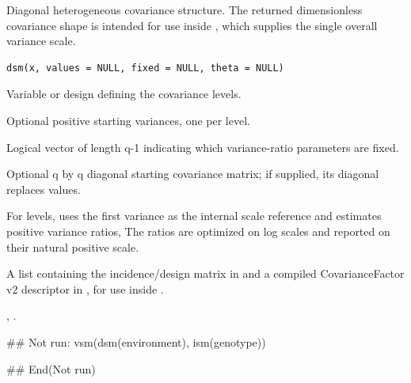 \documentclass[a4paper]{book}
\begin{document}
%
\begin{Description}\relax
Diagonal heterogeneous covariance structure. The returned dimensionless covariance shape is intended for use inside , which supplies the single overall variance scale.
\end{Description}
%
\begin{Usage}
\begin{verbatim}
dsm(x, values = NULL, fixed = NULL, theta = NULL)
\end{verbatim}
\end{Usage}
%
\begin{Arguments}
\begin{ldescription}
\item[\code{x}] Variable or design defining the covariance levels.
\item[\code{values}] Optional positive starting variances, one per level.
\item[\code{fixed}] Logical vector of length q-1 indicating which variance-ratio parameters are fixed.
\item[\code{theta}] Optional q by q diagonal starting covariance matrix; if supplied, its diagonal replaces values.
\end{ldescription}
\end{Arguments}
%
\begin{Details}\relax
For  levels,  uses the first variance as the internal scale reference and estimates  positive variance ratios,  The ratios are optimized on log scales and reported on their natural positive scale.
\end{Details}
%
\begin{Value}
A list containing the incidence/design matrix in  and a compiled CovarianceFactor v2 descriptor in , for use inside .
\end{Value}
%
\begin{SeeAlso}\relax
{}, .
\end{SeeAlso}
%
\begin{Examples}
\begin{ExampleCode}
## Not run: 
vsm(dsm(environment), ism(genotype))

## End(Not run)
\end{ExampleCode}
\end{Examples}
\end{document}
